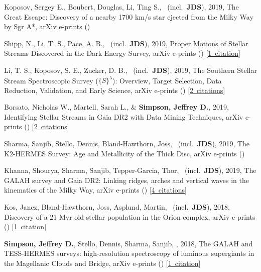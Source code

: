 \item[{\color{numcolor}\scriptsize8}] Koposov, Sergey E., Boubert, Douglas, Li, Ting S., \etal\ (incl.\ \textbf{JDS}), 2019, The Great Escape: Discovery of a nearby 1700 km/s star ejected from the Milky Way by Sgr A*, arXiv e-prints ()

\item[{\color{numcolor}\scriptsize7}] Shipp, N., Li, T. S., Pace, A. B., \etal\ (incl.\ \textbf{JDS}), 2019, Proper Motions of Stellar Streams Discovered in the Dark Energy Survey, arXiv e-prints () [\href{https://ui.adsabs.harvard.edu/#abs/2019arXiv190709488S}{1~citation}]

\item[{\color{numcolor}\scriptsize6}] Li, T. S., Koposov, S. E., Zucker, D. B., \etal\ (incl.\ \textbf{JDS}), 2019, The Southern Stellar Stream Spectroscopic Survey (${\{}S{\}}^5$): Overview, Target Selection, Data Reduction, Validation, and Early Science, arXiv e-prints () [\href{https://ui.adsabs.harvard.edu/#abs/2019arXiv190709481L}{2~citations}]

\item[{\color{numcolor}\scriptsize5}] Borsato, Nicholas W., Martell, Sarah L., \& \textbf{Simpson, Jeffrey D.}, 2019, Identifying Stellar Streams in Gaia DR2 with Data Mining Techniques, arXiv e-prints () [\href{https://ui.adsabs.harvard.edu/#abs/2019arXiv190702527B}{2~citations}]

\item[{\color{numcolor}\scriptsize4}] Sharma, Sanjib, Stello, Dennis, Bland-Hawthorn, Joss, \etal\ (incl.\ \textbf{JDS}), 2019, The K2-HERMES Survey: Age and Metallicity of the Thick Disc, arXiv e-prints ()

\item[{\color{numcolor}\scriptsize3}] Khanna, Shourya, Sharma, Sanjib, Tepper-Garcia, Thor, \etal\ (incl.\ \textbf{JDS}), 2019, The GALAH survey and Gaia DR2: Linking ridges, arches and vertical waves in the kinematics of the Milky Way, arXiv e-prints () [\href{https://ui.adsabs.harvard.edu/#abs/2019arXiv190210113K}{4~citations}]

\item[{\color{numcolor}\scriptsize2}] Kos, Janez, Bland-Hawthorn, Joss, Asplund, Martin, \etal\ (incl.\ \textbf{JDS}), 2018, Discovery of a 21 Myr old stellar population in the Orion complex, arXiv e-prints () [\href{https://ui.adsabs.harvard.edu/#abs/2018arXiv181111762K}{1~citation}]

\item[{\color{numcolor}\scriptsize1}] \textbf{Simpson, Jeffrey D.}, Stello, Dennis, Sharma, Sanjib, \etal, 2018, The GALAH and TESS-HERMES surveys: high-resolution spectroscopy of luminous supergiants in the Magellanic Clouds and Bridge, arXiv e-prints () [\href{https://ui.adsabs.harvard.edu/#abs/2018arXiv180405900S}{1~citation}]